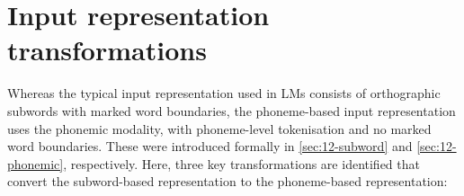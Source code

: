 



\section{Input representation transformations}

Whereas the typical input representation used in LMs consists of orthographic subwords with marked word boundaries, the phoneme-based input representation uses the phonemic modality, with phoneme-level tokenisation and no marked word boundaries. These were introduced formally in \cref{sec:12-subword} and \cref{sec:12-phonemic}, respectively. Here, three key transformations are identified that convert the subword-based representation to the phoneme-based representation:

